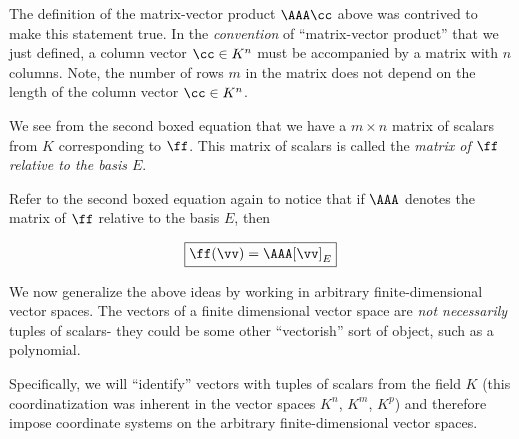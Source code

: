 \begin{defn}
    The definition of the matrix-vector product $\AAA \cc$ above was contrived to make this statement true. In the \textit{convention} of ``matrix-vector product'' that we just defined, a column vector $\cc \in K^n$ must be accompanied by a matrix with $n$ columns. Note, the number of rows $m$ in the matrix does not depend on the length of the column vector $\cc \in K^n$.
    
    We see from the second boxed equation that we have a $m \times n$ matrix of scalars from $K$ corresponding to $\ff$. This matrix of scalars is called the \textit{matrix of $\ff$ relative to the basis $E$}. 
    
    Refer to the second boxed equation again to notice that if $\AAA$ denotes the matrix of $\ff$ relative to the basis $E$, then
    
    \begin{align*}
        \boxed
        {
            \ff(\vv) = \AAA [\vv]_E
        }
    \end{align*}
\end{defn}

\vspace{2cm}

We now generalize the above ideas by working in arbitrary finite-dimensional vector spaces. The vectors of a finite dimensional vector space are \textit{not necessarily} tuples of scalars- they could be some other ``vectorish'' sort of object, such as a polynomial. 

Specifically, we will ``identify'' vectors with tuples of scalars from the field $K$ (this coordinatization was inherent in the vector spaces $K^n$, $K^m$, $K^p$) and therefore impose coordinate systems on the arbitrary finite-dimensional vector spaces.

